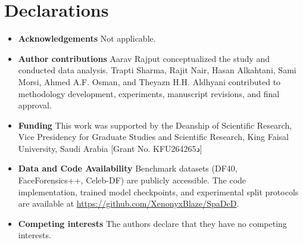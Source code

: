 \documentclass[runningheads]{llncs}
\begin{document}






\section*{Declarations}
\begin{itemize}
\item \textbf{Acknowledgements} Not applicable.
\item \textbf{Author contributions} Aarav Rajput conceptualized the study and conducted data analysis. Trapti Sharma, Rajit Nair, Hasan Alkahtani, Sami Morsi, Ahmed A.F. Osman, and Theyazn H.H. Aldhyani contributed to methodology development, experiments, manuscript revisions, and final approval.
\item \textbf{Funding} This work was supported by the Deanship of Scientific Research, Vice Presidency for Graduate Studies and Scientific Research, King Faisal University, Saudi Arabia [Grant No. KFU264265د]
\item \textbf{Data and Code Availability} Benchmark datasets (DF40, FaceForensics++, Celeb-DF) are publicly accessible. The code implementation, trained model checkpoints, and experimental split protocols are available at \url{https://github.com/XenonyxBlaze/SpaDeD}.
\item \textbf{Competing interests} The authors declare that they have no competing interests.
\end{itemize}


\end{document}
